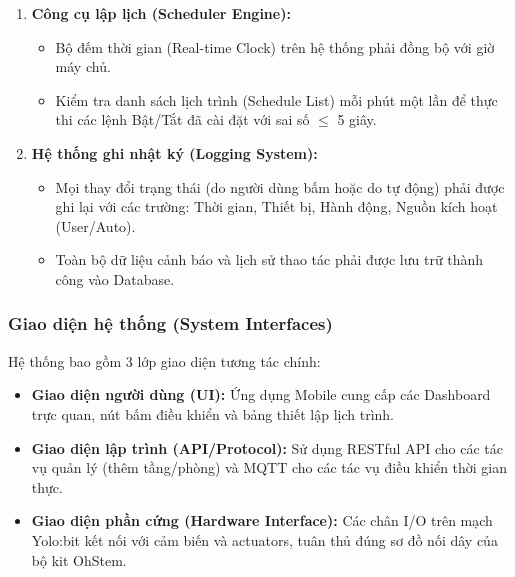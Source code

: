 \begin{enumerate}[label=\textbf{SR\arabic*:}]
    \item \textbf{Công cụ lập lịch (Scheduler Engine):}
    \begin{itemize}
        \item Bộ đếm thời gian (Real-time Clock) trên hệ thống phải đồng bộ với giờ máy chủ.
        \item Kiểm tra danh sách lịch trình (Schedule List) mỗi phút một lần để thực thi các lệnh Bật/Tắt đã cài đặt với sai số $\leq$ 5 giây.
    \end{itemize}

    \item \textbf{Hệ thống ghi nhật ký (Logging System):}
    \begin{itemize}
        \item Mọi thay đổi trạng thái (do người dùng bấm hoặc do tự động) phải được ghi lại với các trường: Thời gian, Thiết bị, Hành động, Nguồn kích hoạt (User/Auto).
        \item Toàn bộ dữ liệu cảnh báo và lịch sử thao tác phải được lưu trữ thành công vào Database.
    \end{itemize}
\end{enumerate}

\subsubsection{Giao diện hệ thống (System Interfaces)}

Hệ thống bao gồm 3 lớp giao diện tương tác chính:
\begin{itemize}
    \item \textbf{Giao diện người dùng (UI):} Ứng dụng Mobile cung cấp các Dashboard trực quan, nút bấm điều khiển và bảng thiết lập lịch trình.
    \item \textbf{Giao diện lập trình (API/Protocol):} Sử dụng RESTful API cho các tác vụ quản lý (thêm tầng/phòng) và MQTT cho các tác vụ điều khiển thời gian thực.
    \item \textbf{Giao diện phần cứng (Hardware Interface):} Các chân I/O trên mạch Yolo:bit kết nối với cảm biến và actuators, tuân thủ đúng sơ đồ nối dây của bộ kit OhStem.
\end{itemize}